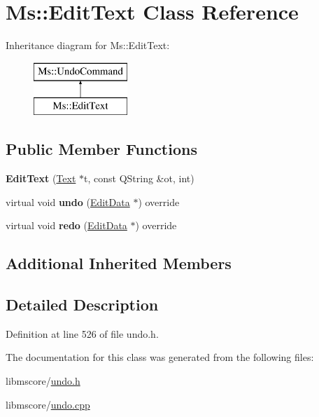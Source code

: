 \hypertarget{class_ms_1_1_edit_text}{}\section{Ms\+:\+:Edit\+Text Class Reference}
\label{class_ms_1_1_edit_text}
Inheritance diagram for Ms\+:\+:Edit\+Text\+:\begin{figure}[H]
\begin{center}
\leavevmode
\includegraphics[height=2.000000cm]{class_ms_1_1_edit_text}
\end{center}
\end{figure}
\subsection*{Public Member Functions}
\begin{DoxyCompactItemize}
\item 
\mbox{\label{class_ms_1_1_edit_text_a053c70989cae85ceea961d5384d9135d}} 
{\bfseries Edit\+Text} (\hyperlink{class_ms_1_1_text}{Text} $\ast$t, const Q\+String \&ot, int)
\item 
\mbox{\label{class_ms_1_1_edit_text_a5fcaa446957ff3282e992ba6048afd5c}} 
virtual void {\bfseries undo} (\hyperlink{class_ms_1_1_edit_data}{Edit\+Data} $\ast$) override
\item 
\mbox{\label{class_ms_1_1_edit_text_ae995c1d9f1136c2ea6a44c8033be6e23}} 
virtual void {\bfseries redo} (\hyperlink{class_ms_1_1_edit_data}{Edit\+Data} $\ast$) override
\end{DoxyCompactItemize}
\subsection*{Additional Inherited Members}


\subsection{Detailed Description}


Definition at line 526 of file undo.\+h.



The documentation for this class was generated from the following files\+:\begin{DoxyCompactItemize}
\item 
libmscore/\hyperlink{undo_8h}{undo.\+h}\item 
libmscore/\hyperlink{undo_8cpp}{undo.\+cpp}\end{DoxyCompactItemize}
